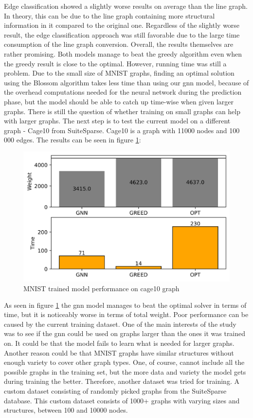 Edge classification showed a slightly worse results on average than the line graph. In theory, this can be due to the line graph containing more structural information in it compared to the original one. Regardless of the slightly worse result, the edge classification approach was still favorable due to the large time consumption of the line graph conversion. Overall, the results themselves are rather promising. Both models manage to beat the greedy algorithm even when the greedy result is close to the optimal. However, running time was still a problem. Due to the small size of MNIST graphs, finding an optimal solution using the Blossom algorithm takes less time than using our \gls{gnn} model, because of the overhead computations needed for the neural network during the prediction phase, but the model should be able to catch up time-wise when given larger graphs. There is still the question of whether training on small graphs can help with larger graphs. The next step is to test the current model on a different graph - Cage10 from SuiteSparse. Cage10 is a graph with 11000 nodes and 100 000 edges. The results can be seen in figure \ref{model performance}:

\begin{figure}[H]
    \centering
    \includegraphics[scale=1.0]{figures/MNISTtrainCAGE10}
    \caption{MNIST trained model performance on cage10 graph}
    \label{model performance}
\end{figure}

As seen in figure \ref{model performance} the \gls{gnn} model manages to beat the optimal solver in terms of time, but it is noticeably worse in terms of total weight. Poor performance can be caused by the current training dataset. One of the main interests of the study was to see if the \gls{gnn} could be used on graphs larger than the ones it was trained on. It could be that the model fails to learn what is needed for larger graphs. Another reason could be that MNIST graphs have similar structures without enough variety to cover other graph types. One, of course, cannot include all the possible graphs in the training set, but the more data and variety the model gets during training the better. Therefore, another dataset was tried for training. A custom dataset consisting of randomly picked graphs from the SuiteSparse database. This custom dataset consists of 1000+ graphs with varying sizes and structures, between 100 and 10000 nodes.

